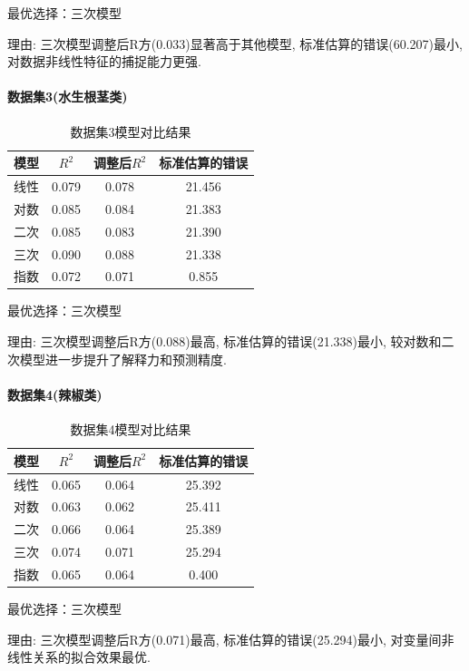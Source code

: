 \documentclass{cumcmthesis}
\begin{document}
最优选择：三次模型

理由: 三次模型调整后R方(0.033)显著高于其他模型, 标准估算的错误(60.207)最小, 对数据非线性特征的捕捉能力更强. 


\paragraph{数据集3(水生根茎类)}
\begin{table}[H]
\centering
\begin{tabular}{cccc}
\hline
模型 & $R^2$ & 调整后$R^2$ & 标准估算的错误 \\
\hline
线性 & 0.079 & 0.078 & 21.456 \\
对数 & 0.085 & 0.084 & 21.383 \\
二次 & 0.085 & 0.083 & 21.390 \\
三次 & 0.090 & 0.088 & 21.338 \\
指数 & 0.072 & 0.071 & 0.855 \\
\hline
\end{tabular}
\caption{数据集3模型对比结果}
\label{tab:dataset3}
\end{table}

最优选择：三次模型

理由: 三次模型调整后R方(0.088)最高, 标准估算的错误(21.338)最小, 较对数和二次模型进一步提升了解释力和预测精度. 


\paragraph{数据集4(辣椒类)}
\begin{table}[H]
\centering
\begin{tabular}{cccc}
\hline
模型 & $R^2$ & 调整后$R^2$ & 标准估算的错误 \\
\hline
线性 & 0.065 & 0.064 & 25.392 \\
对数 & 0.063 & 0.062 & 25.411 \\
二次 & 0.066 & 0.064 & 25.389 \\
三次 & 0.074 & 0.071 & 25.294 \\
指数 & 0.065 & 0.064 & 0.400 \\
\hline
\end{tabular}
\caption{数据集4模型对比结果}
\label{tab:dataset4}
\end{table}

最优选择：三次模型

理由: 三次模型调整后R方(0.071)最高, 标准估算的错误(25.294)最小, 对变量间非线性关系的拟合效果最优. 
\end{document}
